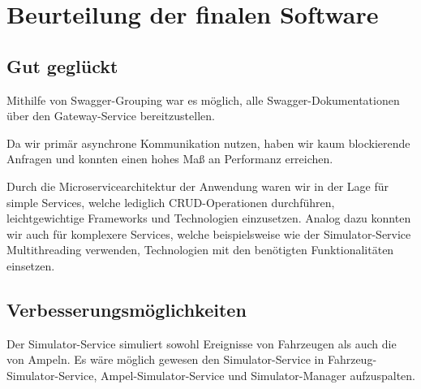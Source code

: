 \section{Beurteilung der finalen Software}

\subsection{Gut geglückt}

Mithilfe von Swagger-Grouping war es möglich, alle Swagger-Dokumentation\-en über den Gateway-Service bereitzustellen.

Da wir primär asynchrone Kommunikation nutzen, haben wir kaum blockierende Anfragen und konnten einen hohes Maß an Performanz erreichen.

Durch die Microservicearchitektur der Anwendung waren wir in der Lage für simple Services, welche lediglich CRUD-Operationen durchführen, leichtgewichtige Frameworks und Technologien
einzusetzen.
Analog dazu konnten wir auch für komplexere Services, welche beispielsweise wie der Simulator-Service Multithreading verwenden, Technologien mit den benötigten Funktionalitäten einsetzen.

\subsection{Verbesserungsmöglichkeiten}

Der Simulator-Service simuliert sowohl Ereignisse von Fahrzeugen als auch die von Ampeln.
Es wäre möglich gewesen den Simulator-Service in Fahrzeug-Simulator-Service, Ampel-Simulator-Service und Simulator-Manager aufzuspalten.
